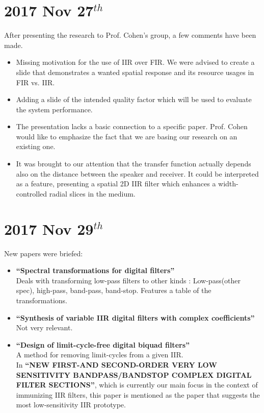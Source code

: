 \documentclass[12pt]{article}
\begin{document}
\section{2017 Nov 27$^{th}$}
After presenting the research to Prof. Cohen's group, a few comments have been made.
\begin{itemize}
\item{
Missing motivation for the use of IIR over FIR. We were advised to create a slide that demonstrates a wanted spatial response and its resource usages in FIR vs. IIR.
}
\item{
Adding a slide of the intended quality factor which will be used to evaluate the system performance.
}
\item{
The presentation lacks a basic connection to a specific paper. Prof. Cohen would like to emphasize the fact that we are basing our research on an existing one.
}
\item{
It was brought to our attention that the transfer function actually depends also on the distance between the speaker and receiver. It could be interpreted as a feature, presenting a spatial 2D IIR filter which enhances a width-controlled radial slices in the medium.
}
\end{itemize}
\section{2017 Nov 29$^{th}$}
New papers were briefed:
\begin{itemize}
\item{
\textbf{``Spectral transformations for digital filters''} \cite{ConstantinidesTHEFilters}
\\
Deals with transforming low-pass filters to other kinds : Low-pass(other spec), high-pass, band-pass, band-stop. Features a table of the transformations.
}
\item{
\textbf{``Synthesis of variable IIR digital filters with complex coefficients''} \cite{Murakoshi1994SynthesisCoefficients}
\\
Not very relevant.
}
\item{
\textbf{``Design of limit-cycle-free digital biquad filters''} \cite{Nishihara1986DesignFilters}
\\
A method for removing limit-cycles from a given IIR.
\\
In \textbf{``NEW FIRST-AND SECOND-ORDER VERY LOW SENSITIVITY BANDPASS/BANDSTOP COMPLEX DIGITAL FILTER SECTIONS''}\cite{StoyanovNEWSECTIONS}, which is currently our main focus in the context of immunizing IIR filters, this paper is mentioned as the paper that suggests the most low-sensitivity IIR prototype.
}
\end{itemize}
\end{document}
